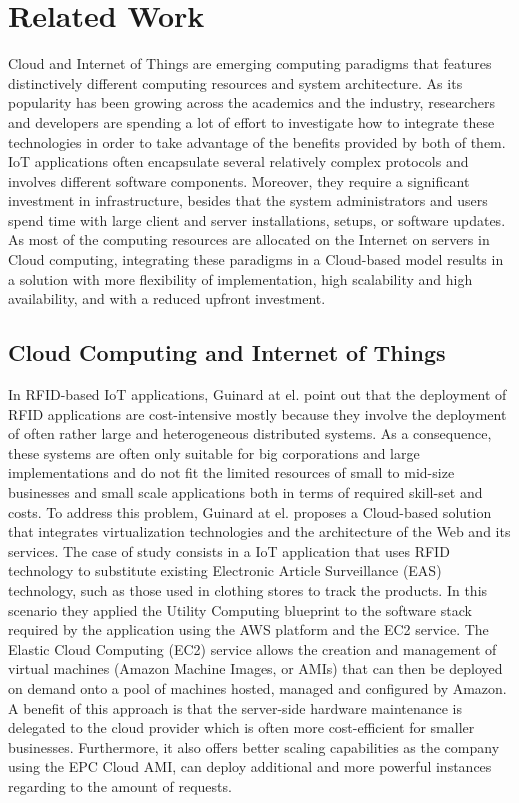 \section{Related Work}
\label{sec:related_work}
Cloud and Internet of Things are emerging computing paradigms that features distinctively different computing resources
and system architecture. As its popularity has been growing across the academics and the industry, researchers and developers
are spending a lot of effort to investigate how to integrate these technologies in order to take advantage of the benefits
provided by both of them.\\
IoT applications often encapsulate several relatively complex protocols and involves different software components. Moreover,
they require a significant investment in infrastructure, besides that the system administrators and users spend time with large
client and server installations, setups, or software updates. As most of the computing resources are allocated on the Internet on servers
in Cloud computing, integrating these paradigms in a Cloud-based model results in a solution with more flexibility of implementation,
high scalability and high availability, and with a reduced upfront investment.\\

\subsection{Cloud Computing and Internet of Things}
\label{sub:Cloud Computing and Internet of Things}
In RFID-based IoT applications, Guinard at el. \cite{guinard2011cloud} point out that the deployment of RFID applications are cost-intensive mostly
because they involve the deployment of often rather large and heterogeneous distributed systems. As a consequence, these systems are often only
suitable for big corporations and large implementations and do not fit the limited resources of small to mid-size businesses and small scale
applications both in terms of required skill-set and costs. To address this problem, Guinard at el. proposes a Cloud-based solution that
integrates virtualization technologies and the architecture of the Web and its services. The case of study consists in a IoT application that uses
RFID technology to substitute existing Electronic Article Surveillance (EAS) technology, such as those used in clothing stores to track the products.
In this scenario they applied the Utility Computing blueprint to the software stack required by the application using the AWS platform and the EC2 service.
The Elastic Cloud Computing (EC2) service allows the creation and management of virtual machines (Amazon Machine Images, or AMIs) that can then be deployed on
demand onto a pool of machines hosted, managed and configured by Amazon. A benefit of this approach is that the server-side hardware maintenance is delegated to
the cloud provider which is often more cost-efficient for smaller businesses. Furthermore, it also offers better scaling capabilities as the company using the
EPC Cloud AMI, can deploy additional and more powerful instances regarding to the amount of requests.\\

